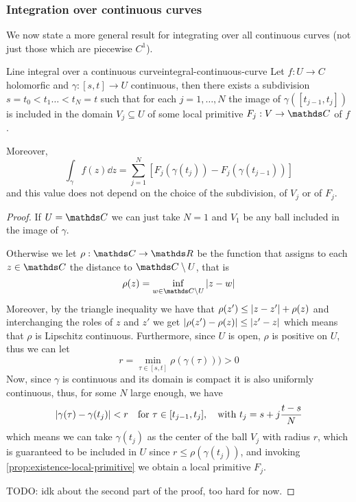 \documentclass[12pt]{extarticle}
\begin{document}
\subsubsection{Integration over continuous curves}

We now state a more general result for integrating over all continuous curves
(not just those which are piecewise $C^1$).

\begin{proposition}{Line integral over a continuous curve}{integral-continuous-curve}
	Let $f: U \to C$ holomorfic and $\gamma: [s, t] \to U$ continuous,
	then there exists a subdivision $s = t_0 < t_1 \dots < t_N = t$ such that
	for each $j = 1, \dots, N$ the image of $\gamma([t_{j-1}, t_j])$ is included in the domain
	$V_j \subseteq U$ of some local primitive $F_j: V \to \C$ of $f$.

	Moreover,
	\begin{equation}
		\int_\gamma f(z) \dd z = \sum_{j = 1}^N [F_j(\gamma(t_j)) - F_j(\gamma(t_{j-1}))]
	\end{equation}
	and this value does not depend on the choice of the subdivision, of $V_j$ or of $F_j$.
\end{proposition}

\begin{proof}
	If $U = \C$ we can just take $N = 1$ and $V_1$ be any ball included in the image of $\gamma$.

	Otherwise we let $\rho: \C \to \R$ be the function that assigns to each $z \in \C$ the distance to
	$\C \setminus U$, that is
	\begin{equation}
		\rho(z) = \inf_{w \in \C \setminus U} \abs{z - w}
	\end{equation}
	Moreover, by the triangle inequality we have that $\rho(z') \leq \abs{z-z'} + \rho(z)$
	and interchanging the roles of $z$ and $z'$ we get $\abs{\rho(z') - \rho(z)} \leq \abs{z' - z}$
	which means that $\rho$ is Lipschitz continuous.
	Furthermore, since $U$ is open, $\rho$ is positive on $U$, thus we can let
	\begin{equation}
		r = \min_{\tau \in [s, t]} \rho(\gamma(\tau))) > 0
	\end{equation}
	Now, since $\gamma$ is continuous and its domain is compact it is also uniformly continuous,
	thus, for some $N$ large enough, we have
	\begin{equation}
		\abs{\gamma(\tau) - \gamma(t_j)} < r \quad \text{for } \tau \in [t_{j-1}, t_j],
		\quad \text{with } t_j = s + j \frac{t-s}{N}
	\end{equation}
	which means we can take $\gamma(t_j)$ as the center of the ball $V_j$ with radius $r$, which is
	guaranteed to be included in $U$ since $r \leq \rho(\gamma(t_j))$,
	and invoking \cref{prop:existence-local-primitive} we obtain a local primitive $F_j$.

	TODO: idk about the second part of the proof, too hard for now.
\end{proof}
\end{document}
